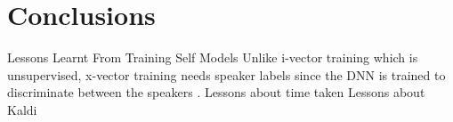 \chapter{Conclusions}

		Lessons Learnt From Training Self Models
				Unlike i-vector training which is unsupervised, x-vector training needs speaker labels since the DNN is trained to discriminate between the speakers \cite{stafylakis2019self}.
Lessons about time taken
Lessons about Kaldi